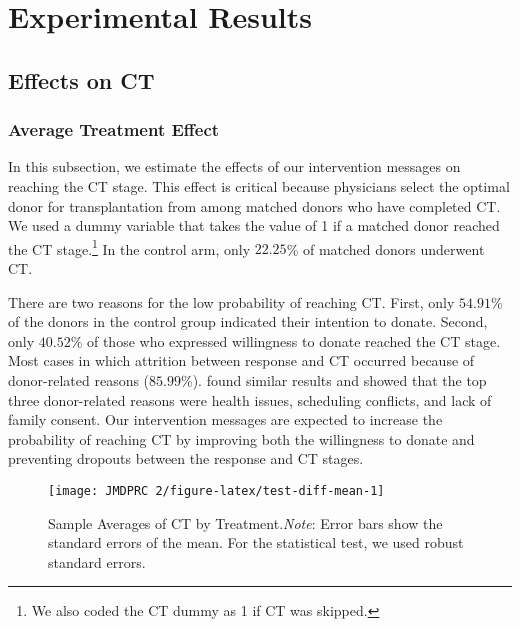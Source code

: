 \documentclass[12pt, a4paper]{article}
\begin{document}
\hypertarget{result}{%
\section{Experimental Results}\label{result}}

\hypertarget{main}{%
\subsection{Effects on CT}\label{main}}

\hypertarget{average-treatment-effect}{%
\subsubsection{Average Treatment Effect}\label{average-treatment-effect}}

In this subsection, we estimate the effects of our intervention messages on reaching the CT stage. This effect is critical because physicians select the optimal donor for transplantation from among matched donors who have completed CT. We used a dummy variable that takes the value of 1 if a matched donor reached the CT stage.\footnote{We also coded the CT dummy as 1 if CT was skipped.} In the control arm, only \(22.25\)\% of matched donors underwent CT.

There are two reasons for the low probability of reaching CT. First, only \(54.91\)\% of the donors in the control group indicated their intention to donate. Second, only \(40.52\)\% of those who expressed willingness to donate reached the CT stage. Most cases in which attrition between response and CT occurred because of donor-related reasons (\(85.99\)\%). \citet{Hirakawa2018} found similar results and showed that the top three donor-related reasons were health issues, scheduling conflicts, and lack of family consent. Our intervention messages are expected to increase the probability of reaching CT by improving both the willingness to donate and preventing dropouts between the response and CT stages.

\begin{figure}[t]
\texttt{[image: JMDPRC~2/figure-latex/test-diff-mean-1]} \caption{Sample Averages of CT by Treatment.\newline \emph{Note}: Error bars show the standard errors of the mean. For the statistical test, we used robust standard errors.}\label{fig:test-diff-mean}
\end{figure}
\end{document}
